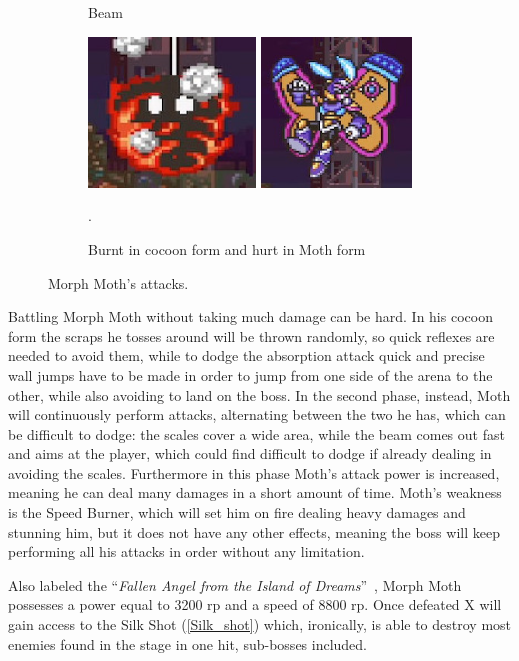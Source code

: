 \begin{figure}[htp]
\begin{subfigure}{0.4\linewidth}
		\caption{Beam}
	\end{subfigure}
	\begin{subfigure}{\linewidth}
		\centering
		\includegraphics[height=4cm]{figures/X2/Morph_moth/Moth_burn.jpg}
		\includegraphics[height=4cm]{figures/X2/Morph_moth/Moth_hurt.jpg}
		\caption{Burnt in cocoon form and hurt in Moth form}.
	\end{subfigure}
	\caption{Morph Moth's attacks.}
\end{figure}


Battling Morph Moth without taking much damage can be hard. In his cocoon form the scraps he tosses around will be thrown randomly, so quick reflexes are needed to avoid them, while to dodge the absorption attack quick and precise wall jumps have to be made in order to jump from one side of the arena to the other, while also avoiding to land on the boss. In the second phase, instead, Moth will continuously perform attacks, alternating between the two he has, which can be difficult to dodge: the scales cover a wide area, while the beam comes out fast and aims at the player, which could find difficult to dodge if already dealing in avoiding the scales. Furthermore in this phase Moth's attack power is increased, meaning  he can deal many damages in a short amount of time. Moth's weakness is the Speed Burner, which will set him on fire dealing heavy damages and stunning him, but it does not have any other effects, meaning the boss will keep performing all his attacks in order without any limitation.

Also labeled the ``\textit{Fallen Angel from the Island of Dreams}''~\cite{book:MMX_Complete_art}, Morph Moth possesses a power equal to 3200 rp and a speed of 8800 rp. Once defeated X will gain access to the Silk Shot (\ref{Silk_shot}) which, ironically, is able to destroy most enemies found in the stage in one hit, sub-bosses included.


